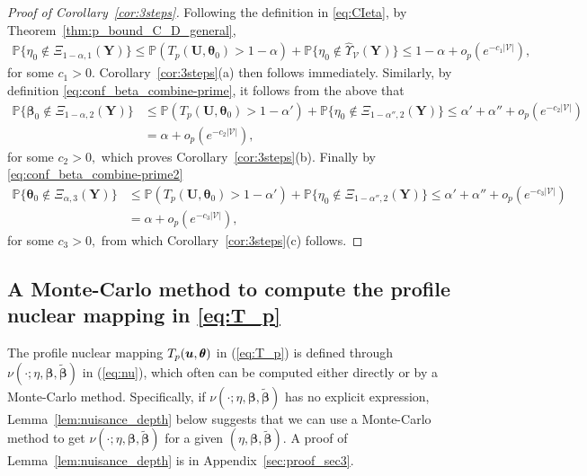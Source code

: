 \documentclass[12pt]{article}
\theoremstyle{shortspace}
\def\*#1{\bm{#1}}
\def\btheta{\mathop{\theta\kern-.45em\hbox{$\theta$}}\nolimits}
\def\P{\mathbb P}
\begin{document}
\begin{proof}[Proof of Corollary~\ref{cor:3steps}]
    Following the definition in \eqref{eq:CIeta}, by Theorem~\ref{thm:p_bound_C_D_general},
    \begin{align*}
        \P\{\eta_0 \not\in \Xi_{1-\alpha, 1}(\*Y)\} \leq \P(T_p(\*U, \*\theta_0) > 1- \alpha) + \P\{\eta_0 \not\in \hat\Upsilon_{\mathcal V}(\*Y)\}\leq 1-\alpha + o_p(e^{-c_1|\mathcal V|}),
    \end{align*}
    for some $c_1>0.$ Corollary~\ref{cor:3steps}(a) then follows immediately. 
    Similarly, by definition \eqref{eq:conf_beta_combine-prime}, it follows from the above that
    \begin{align*}
         \P\{\*\beta_0 \not\in \Xi_{1-\alpha, 2}(\*Y)\} & \leq \P(T_p(\*U, \*\theta_0) > 1- \alpha') + \P\{\eta_0 \not\in \Xi_{1-\alpha'', 2}(\*Y)\} \leq \alpha' +  \alpha'' + o_p(e^{-c_2|\mathcal V|}) \\
         & =  \alpha + o_p(e^{-c_2|\mathcal V|}),
    \end{align*}
    for some $c_2>0,$ which proves Corollary~\ref{cor:3steps}(b). Finally by \eqref{eq:conf_beta_combine-prime2}
    \begin{align*}
         \P\{\*\theta_0 \not\in \Xi_{\alpha, 3}(\*Y)\} & \leq \P(T_p(\*U, \*\theta_0) > 1-\alpha') + \P\{\eta_0 \not\in \Xi_{1-\alpha'', 2}(\*Y)\} \leq \alpha' + \alpha'' + o_p(e^{-c_3|\mathcal V|}) \\
         & = \alpha + o_p(e^{-c_3|\mathcal V|}),
    \end{align*}
    for some $c_3>0,$ from which Corollary~\ref{cor:3steps}(c) follows. 
\end{proof}

\subsection{A Monte-Carlo method to compute the profile nuclear mapping in \eqref{eq:T_p} }\label{sec:depth_profile}
The profile nuclear mapping 
$T_p(\*u, \btheta)$ in (\ref{eq:T_p}) is defined through $\nu(\cdot; \eta, \*\beta, \widetilde {\*\beta})$ in (\ref{eq:nu}), which often can be computed either directly or by a Monte-Carlo method.
Specifically, if $\nu(\cdot; \eta, \*\beta, \widetilde {\*\beta})$ has no explicit expression, 
Lemma~\ref{lem:nuisance_depth} below suggests that we can use a Monte-Carlo method to get $\nu(\cdot; \eta, \*\beta, \widetilde {\*\beta})$ for a given $(\eta, \*\beta, \widetilde {\*\beta})$. A proof of  Lemma~\ref{lem:nuisance_depth} is in Appendix~\ref{sec:proof_sec3}.
\end{document}
